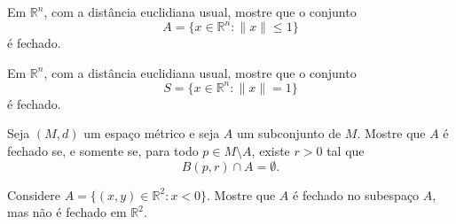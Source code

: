 \begin{exercise}
    Em $\mathbb R^n$, com a distância euclidiana usual, mostre que o conjunto
    \[
        A=\{x\in\mathbb R^n:\|x\|\leq 1\}
    \]
    é fechado.
\end{exercise}

\begin{exercise}
    Em $\mathbb R^n$, com a distância euclidiana usual, mostre que o conjunto
    \[
        S=\{x\in\mathbb R^n:\|x\|=1\}
    \]
    é fechado.
\end{exercise}

\begin{exercise}
    Seja $(M,d)$ um espaço métrico e seja $A$ um subconjunto de $M$.
    Mostre que $A$ é fechado se, e somente se, para todo $p\in M\setminus A$, existe $r>0$ tal que
    \[
        B(p,r)\cap A=\emptyset.
    \]
\end{exercise}

\begin{exercise}
    Considere $A=\{(x, y)\in\mathbb R^2:x<0\}$.
    Mostre que $A$ é fechado no subespaço $A$, mas não é fechado em $\mathbb R^2$.
\end{exercise}
